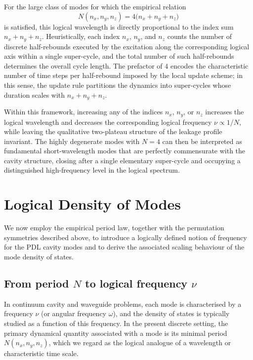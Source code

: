\documentclass{article}
\theoremstyle{definition}
\begin{document}
For the large class of modes for which the empirical relation
\[
N(n_x,n_y,n_z) = 4 \bigl(n_x + n_y + n_z\bigr)
\]
is satisfied,\cite{Effective_Fields_PDL_2026} this logical wavelength is directly proportional to the index sum $n_x + n_y + n_z$. Heuristically, each index $n_x$, $n_y$, and $n_z$ counts the number of discrete half-rebounds executed by the excitation along the corresponding logical axis within a single super-cycle, and the total number of such half-rebounds determines the overall cycle length. The prefactor of $4$ encodes the characteristic number of time steps per half-rebound imposed by the local update scheme; in this sense, the update rule partitions the dynamics into super-cycles whose duration scales with $n_x + n_y + n_z$.

Within this framework, increasing any of the indices $n_x$, $n_y$, or $n_z$ increases the logical wavelength and decreases the corresponding logical frequency $\nu \propto 1/N$, while leaving the qualitative two-plateau structure of the leakage profile invariant.\cite{Effective_Fields_PDL_2026} The highly degenerate modes with $N = 4$ can then be interpreted as fundamental short-wavelength modes that are perfectly commensurate with the cavity structure, closing after a single elementary super-cycle and occupying a distinguished high-frequency level in the logical spectrum.

\section{Logical Density of Modes}

We now employ the empirical period law, together with the permutation symmetries described above, to introduce a logically defined notion of frequency for the PDL cavity modes and to derive the associated scaling behaviour of the mode density of states.

\subsection{From period \texorpdfstring{$N$}{N} to logical frequency \texorpdfstring{$\nu$}{nu}}

In continuum cavity and waveguide problems, each mode is characterised by a frequency $\nu$ (or angular frequency $\omega$), and the density of states is typically studied as a function of this frequency.\cite{Density_of_states_Notes,EM_Cavities_Notes} In the present discrete setting, the primary dynamical quantity associated with a mode is its minimal period $N(n_x,n_y,n_z)$, which we regard as the logical analogue of a wavelength or characteristic time scale.
\end{document}
